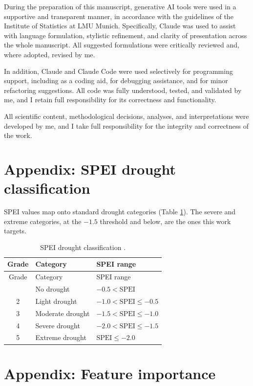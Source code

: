 \documentclass[
]{krantz}
\begin{document}
During the preparation of this manuscript, generative AI tools were used in a supportive and transparent manner, in accordance with the guidelines of the Institute of Statistics at LMU Munich.
Specifically, Claude was used to assist with language formulation, stylistic refinement, and clarity of presentation across the whole manuscript.
All suggested formulations were critically reviewed and, where adopted, revised by me.

In addition, Claude and Claude Code were used selectively for programming support, including as a coding aid, for debugging assistance, and for minor refactoring suggestions.
All code was fully understood, tested, and validated by me, and I retain full responsibility for its correctness and functionality.

All scientific content, methodological decisions, analyses, and interpretations were developed by me, and I take full responsibility for the integrity and correctness of the work.

\section*{Appendix: SPEI drought classification}\label{appendix-spei-drought-classification}


SPEI values map onto standard drought categories (Table \ref{tab:dp-spei-grades}).
The severe and extreme categories, at the \(-1.5\) threshold and below, are the ones this work targets.

\begin{longtable}[]{@{}cll@{}}
\caption{\label{tab:dp-spei-grades} SPEI drought classification \citep{vicenteserrano2010, chen2025}.}\tabularnewline
\toprule\noalign{}
Grade & Category & SPEI range \\
\midrule\noalign{}
\endfirsthead
\toprule\noalign{}
Grade & Category & SPEI range \\
\midrule\noalign{}
\endhead
\bottomrule\noalign{}
\endlastfoot
1 & No drought & \(-0.5 < \text{SPEI}\) \\
2 & Light drought & \(-1.0 < \text{SPEI} \le -0.5\) \\
3 & Moderate drought & \(-1.5 < \text{SPEI} \le -1.0\) \\
4 & Severe drought & \(-2.0 < \text{SPEI} \le -1.5\) \\
5 & Extreme drought & \(\text{SPEI} \le -2.0\) \\
\end{longtable}

\section*{Appendix: Feature importance}\label{appendix-feature-importance}
\end{document}
